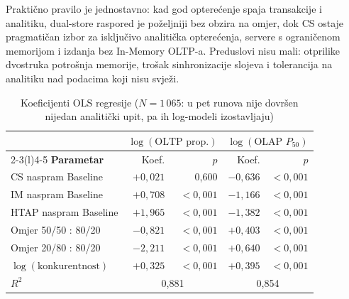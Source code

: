 \documentclass[10pt,conference,a4paper]{IEEEtran}
\begin{document}
Praktično pravilo je jednostavno: kad god opterećenje spaja transakcije i
analitiku, dual-store raspored je poželjniji bez obzira na omjer, dok CS
ostaje pragmatičan izbor za isključivo analitička opterećenja, servere s
ograničenom memorijom i izdanja bez In-Memory OLTP-a. Preduslovi nisu mali:
otprilike dvostruka potrošnja memorije, trošak sinhronizacije slojeva i
tolerancija na analitiku nad podacima koji nisu svježi.

\begin{table}[t]
\caption{Koeficijenti OLS regresije ($N = 1\,065$: u pet runova nije dovršen
nijedan analitički upit, pa ih log-modeli izostavljaju)}
\label{tab:ols}
\centering
\footnotesize
\begin{tabular}{@{}lrrrr@{}}
\toprule
& \multicolumn{2}{c}{$\log(\text{OLTP prop.})$} & \multicolumn{2}{c}{$\log(\text{OLAP } P_{50})$}\\
\cmidrule(lr){2-3}\cmidrule(l){4-5}
\textbf{Parametar} & Koef. & $p$ & Koef. & $p$\\
\midrule
CS naspram Baseline        & $+0{,}021$ & 0,600  & $-0{,}636$ & $<0{,}001$\\
IM naspram Baseline        & $+0{,}708$ & $<0{,}001$ & $-1{,}166$ & $<0{,}001$\\
HTAP naspram Baseline      & $+1{,}965$ & $<0{,}001$ & $-1{,}382$ & $<0{,}001$\\
Omjer 50/50 : 80/20        & $-0{,}821$ & $<0{,}001$ & $+0{,}403$ & $<0{,}001$\\
Omjer 20/80 : 80/20        & $-2{,}211$ & $<0{,}001$ & $+0{,}640$ & $<0{,}001$\\
$\log(\text{konkurentnost})$ & $+0{,}325$ & $<0{,}001$ & $+0{,}395$ & $<0{,}001$\\
\midrule
$R^2$ & \multicolumn{2}{c}{0,881} & \multicolumn{2}{c}{0,854}\\
\bottomrule
\end{tabular}
\end{table}
\end{document}
